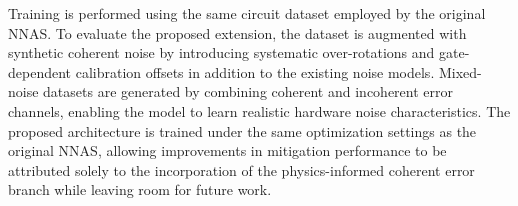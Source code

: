 Training is performed using the same circuit dataset employed by the original NNAS. To evaluate the proposed extension, the dataset is augmented with synthetic coherent noise by introducing systematic over-rotations and gate-dependent calibration offsets in addition to the existing noise models. Mixed-noise datasets are generated by combining coherent and incoherent error channels, enabling the model to learn realistic hardware noise characteristics. The proposed architecture is trained under the same optimization settings as the original NNAS, allowing improvements in mitigation performance to be attributed solely to the incorporation of the physics-informed coherent error branch while leaving room for future work.
